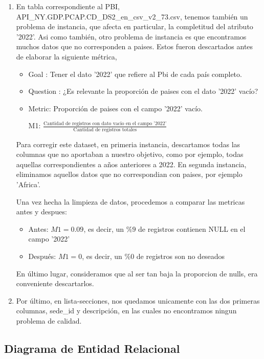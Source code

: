 \documentclass[10pt,a4paper]{article}
\begin{document}
\begin{enumerate}
	\item En tabla correspondiente al PBI, API\_NY.GDP.PCAP.CD\_DS2\_en\_csv\_v2\_73.csv, tenemos también un problema de instancia, que afecta en particular, la completitud del atributo '2022'. Asi como también, otro problema de instancia es que encontramos muchos datos que no corresponden a paises. Estos fueron descartados antes de elaborar la siguiente métrica,
\begin{itemize}
	\item Goal : Tener el dato '2022' que refiere al Pbi de cada país completo.
	\item Question : ¿Es relevante la proporción de paises con el dato '2022' vacío?
	\item Metric: Proporción de paises con el campo '2022' vacío.
        \begin{center}
            M1: $\frac{\text{Cantidad de registros con dato vacio en el campo '2022'}}{\text{Cantidad de registros totales}}$
        \end{center}
\end{itemize}
Para corregir este dataset, en primeria instancia, descartamos todas las columnas que no aportaban a nuestro objetivo, como por ejemplo, 
todas aquellas correspondientes a años anteriores a 2022. En segunda instancia, eliminamos aquellos datos que no correspondian con paises, 
por ejemplo 'Africa'. 

Una vez hecha la limpieza de datos, procedemos a comparar las metricas antes y despues:

\begin{itemize}
    \item Antes: $M1 =  0.09$, es decir, un $\% 9$ de registros contienen NULL en el campo '2022'
    \item Después: $M1 =  0$, es decir, un $\% 0$ de registros son no deseados
\end{itemize}

En último lugar, consideramos que al ser tan baja la proporcion de nulls, era conveniente descartarlos. 

	\item Por último, en lista-secciones, nos quedamos unicamente con las dos primeras columnas, sede\_id y descripción, en las cuales no encontramos ningun problema de calidad.
\end{enumerate}

\newpage
\subsection{Diagrama de Entidad Relacional} \vspace{0.2cm}
\end{document}
